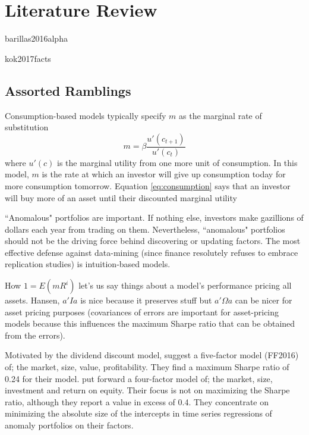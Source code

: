 
\section{Literature Review}

{barillas2016alpha}

{kok2017facts}

\subsection{Assorted Ramblings}

Consumption-based models typically specify $m$ as the marginal rate of 
substitution
\begin{equation}
\label{eq:consumption}
m=\beta\frac{u'(c_{t+1})}{u'(c_t)}
\end{equation}
where $u'(c)$ is the marginal utility from one more unit of consumption.
In this model, $m$ is the rate at which an investor will give up consumption 
today for more consumption tomorrow.
Equation \ref{eq:consumption} says that an investor will buy more of an asset 
until their discounted marginal utility

``Anomalous" portfolios are important.
If nothing else, investors make gazillions of dollars each year from trading 
on them.
Nevertheless, ``anomalous" portfolios should not be the driving force behind 
discovering or updating factors.
The most effective defense against data-mining (since finance resolutely 
refuses to embrace replication studies) is intuition-based models.

How $1=E(mR^i)$ let's us say things about a model's performance pricing all 
assets.
Hansen, $a'Ia$ is nice because it preserves stuff but
$a'\Omega a$ can be nicer for asset pricing purposes (covariances of errors 
are important for asset-pricing models because this influences the maximum 
Sharpe ratio that can be obtained from the errors).

Motivated by the dividend discount model, \cite{fama2016choosing} 
suggest a five-factor model (FF2016) of; the market, size, value, 
profitability.
They find a maximum Sharpe ratio of 0.24 for their model.
\cite{hou2015digesting} put forward a four-factor model of; the market, size, 
investment and return on equity.
Their focus is not on maximizing the Sharpe ratio, although they report a 
value in excess of 0.4.
They concentrate on minimizing the absolute size of the intercepts in time 
series regressions of anomaly portfolios on their factors.


